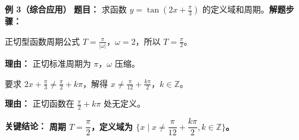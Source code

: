 \begin{examplebox}
	\medskip
	\textbf{\textcolor{CExample}{例 3（综合应用）}}
	\textbf{\textcolor{CExample}{题目：}} 求函数 $y=\tan(2x+\frac{\pi}{3})$ 的定义域和周期。\textbf{\textcolor{CExample}{解题步骤：}}
	\begin{description}[style=nextline, leftmargin=2.8em, labelsep=0.5em, itemsep=0.45em]
		\item[\textbf{第一步（周期计算）：}]
			正切型函数周期公式 $T=\frac{\pi}{|\omega|}$，$\omega=2$，所以 $T=\frac{\pi}{2}$。
			\par\textbf{理由：} 正切标准周期为 $\pi$，$\omega$ 压缩。
		\item[\textbf{第二步（定义域求解）：}]
			要求 $2x+\frac{\pi}{3}\neq\frac{\pi}{2}+k\pi$，解得 $x\neq\frac{\pi}{12}+\frac{k\pi}{2}$，$k\in\mathbb{Z}$。
			\par\textbf{理由：} 正切函数在 $\frac{\pi}{2}+k\pi$ 处无定义。
	\end{description}
	\textbf{\textcolor{CExample}{关键结论：}}
	\textbf{周期 $T=\dfrac{\pi}{2}$，定义域为 $\{x\mid x\neq\dfrac{\pi}{12}+\dfrac{k\pi}{2},k\in\mathbb{Z}\}$。}
\end{examplebox}
